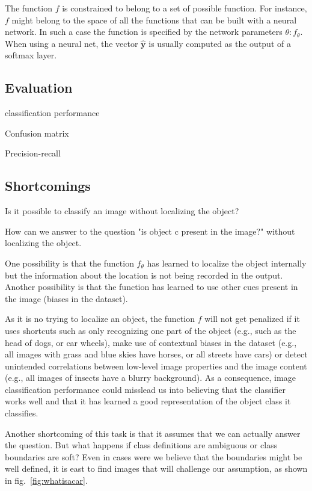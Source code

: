 The function $f$ is constrained to belong to a set of possible function. For instance, $f$ might belong to the space of all the functions that can be built with a neural network. In such a case the function is specified by the network parameters $\theta: f_\theta$. When using a neural net, the vector $\hat{\mathbf{y}}$ is usually computed as the output of a softmax layer. 

\subsection{Evaluation}

classification performance

Confusion matrix

Precision-recall

\subsection{Shortcomings}


Is it possible to classify an image without localizing the object?

How can we answer to the question "is object c present in the image?" without localizing the object. 

One possibility is that the function $f_\theta$ has learned to localize the object internally but the information about the location is not being recorded in the output. Another possibility is that the function has learned to use other cues present in the image (biases in the dataset).

 As it is no trying to localize an object, the function $f$ will not get penalized if it uses shortcuts such as only recognizing one part of the object (e.g., such as the head of dogs, or car wheels),  make use of contextual biases in the dataset (e.g., all images with grass and blue skies have horses, or all streets have cars) or detect unintended correlations between low-level image properties and the image content (e.g., all images of insects have a blurry background). As a consequence, image classification performance could misslead us into believing that the classifier works well and that it has learned a good representation of the object class it classifies. 

Another shortcoming of this task is that it assumes that we can actually answer the question. But what happens if class definitions are ambiguous or class boundaries are soft? Even in cases were we believe that the boundaries might be well defined, it is east to find images that will challenge our assumption, as shown in fig.~\ref{fig:whatisacar}.


